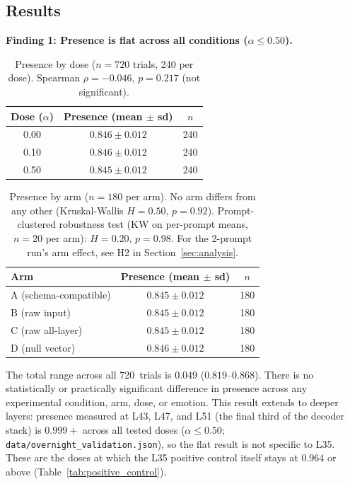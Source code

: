 \documentclass[11pt,a4paper]{article}
\begin{document}
\subsection{Results}
\label{sec:results}

\textbf{Finding 1: Presence is flat across all conditions
($\alpha \le 0.50$).}

\begin{table}[H]
\centering
\caption{Presence by dose ($n = 720$ trials, 240 per dose). Spearman $\rho{=}{-}0.046$,
$p{=}0.217$ (not significant).}
\label{tab:presence_dose}
\begin{tabular}{ccc}
\toprule
Dose ($\alpha$) & Presence (mean $\pm$ sd) & $n$ \\
\midrule
0.00 & $0.846 \pm 0.012$ & 240 \\
0.10 & $0.846 \pm 0.012$ & 240 \\
0.50 & $0.845 \pm 0.012$ & 240 \\
\bottomrule
\end{tabular}
\end{table}

\begin{table}[H]
\centering
\caption{Presence by arm ($n = 180$ per arm). No arm differs from any
other (Kruskal-Wallis $H{=}0.50$, $p{=}0.92$). Prompt-clustered
robustness test (KW on per-prompt means, $n{=}20$ per arm):
$H{=}0.20$, $p{=}0.98$. For the 2-prompt run's arm effect, see H2
in Section~\ref{sec:analysis}.}
\label{tab:presence_arm}
\begin{tabular}{lcc}
\toprule
Arm & Presence (mean $\pm$ sd) & $n$ \\
\midrule
A (schema-compatible) & $0.845 \pm 0.012$ & 180 \\
B (raw input) & $0.845 \pm 0.012$ & 180 \\
C (raw all-layer) & $0.845 \pm 0.012$ & 180 \\
D (null vector) & $0.846 \pm 0.012$ & 180 \\
\bottomrule
\end{tabular}
\end{table}

The total range across all 720~trials is 0.049 ($0.819$--$0.868$).
There is no statistically or practically significant difference in
presence across any experimental condition, arm, dose, or emotion.
This result extends to deeper layers: presence measured at L43, L47,
and L51 (the final third of the decoder stack) is $0.999{+}$ across
all tested doses ($\alpha \le 0.50$; \nolinkurl{data/overnight_validation.json}),
so the flat result is not specific to L35. These are the doses at which
the L35 positive control itself stays at $0.964$ or above
(Table~\ref{tab:positive_control}).
\end{document}
